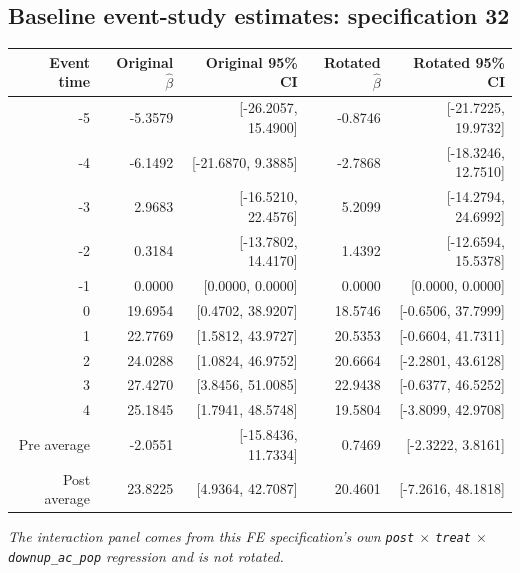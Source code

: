 \documentclass[10pt]{article}
\begin{document}
\subsection*{Baseline event-study estimates: specification 32}
\begin{center}
\scriptsize
\begin{tabular}{r rr rr}
\toprule
Event time & Original $\hat\beta$ & Original 95\% CI & Rotated $\hat\beta$ & Rotated 95\% CI \\
\midrule
-5 & -5.3579 & [-26.2057, 15.4900] & -0.8746 & [-21.7225, 19.9732] \\
-4 & -6.1492 & [-21.6870, 9.3885] & -2.7868 & [-18.3246, 12.7510] \\
-3 & 2.9683 & [-16.5210, 22.4576] & 5.2099 & [-14.2794, 24.6992] \\
-2 & 0.3184 & [-13.7802, 14.4170] & 1.4392 & [-12.6594, 15.5378] \\
-1 & 0.0000 & [0.0000, 0.0000] & 0.0000 & [0.0000, 0.0000] \\
0 & 19.6954 & [0.4702, 38.9207] & 18.5746 & [-0.6506, 37.7999] \\
1 & 22.7769 & [1.5812, 43.9727] & 20.5353 & [-0.6604, 41.7311] \\
2 & 24.0288 & [1.0824, 46.9752] & 20.6664 & [-2.2801, 43.6128] \\
3 & 27.4270 & [3.8456, 51.0085] & 22.9438 & [-0.6377, 46.5252] \\
4 & 25.1845 & [1.7941, 48.5748] & 19.5804 & [-3.8099, 42.9708] \\
\midrule
Pre average & -2.0551 & [-15.8436, 11.7334] & 0.7469 & [-2.3222, 3.8161] \\
Post average & 23.8225 & [4.9364, 42.7087] & 20.4601 & [-7.2616, 48.1818] \\
\bottomrule
\end{tabular}
\end{center}
\medskip
\textit{The interaction panel comes from this FE specification's own \texttt{post} $\times$ \texttt{treat} $\times$ \texttt{downup\_ac\_pop} regression and is not rotated.}
\clearpage
\end{document}

